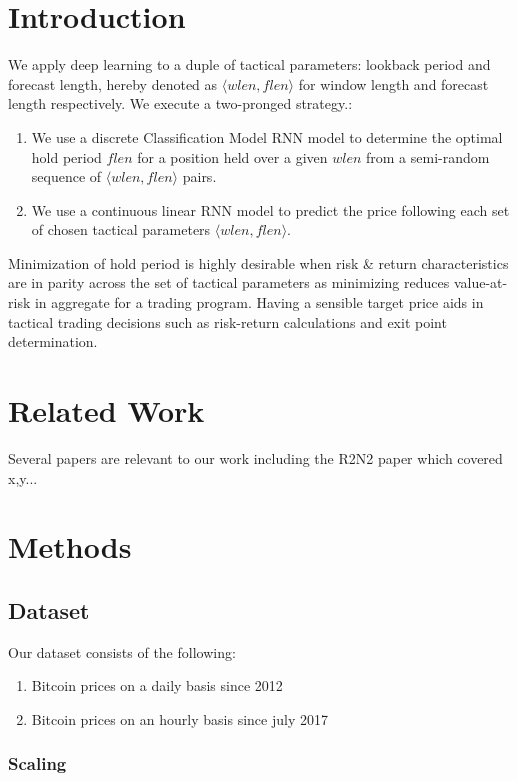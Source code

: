 \documentclass{article}
\begin{document}
\begin{multicols}{2}
\section{Introduction}
 We apply deep learning to a duple of tactical parameters: lookback period and forecast length, hereby denoted as $\langle wlen, flen \rangle$ for window length and forecast length respectively. We execute a two-pronged strategy.:
\begin{enumerate}
\item We use a discrete Classification Model RNN model to determine the optimal hold period $flen$ for a position held over a given $wlen$ from a semi-random sequence of $\langle wlen, flen \rangle$ pairs.
\item We use a continuous linear RNN model to predict the price following each set of chosen tactical parameters $\langle wlen, flen \rangle$.
\end{enumerate}
Minimization of hold period is highly desirable when risk & return characteristics are in parity across the set of tactical parameters as minimizing reduces value-at-risk in aggregate for a trading program. Having a sensible target price aids in tactical trading decisions such as risk-return calculations and exit point determination.


\section{Related Work}
Several papers are relevant to our work including the R2N2 paper \cite{1_website}  which covered x,y...

\section{Methods}
\subsection{Dataset}
Our dataset consists of the following:
\begin{enumerate}
    \item Bitcoin prices on a daily basis since 2012
    \item Bitcoin prices on an hourly basis since july 2017
\end{enumerate}


\subsubsection{Scaling}

\end{multicols}
\end{document}
